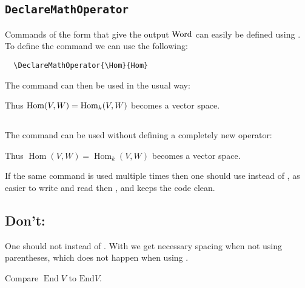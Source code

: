\documentclass[a4paper, 10pt, abstract=on, headings=standardclasses]{scrartcl}
\begin{document}
\subsection{\texttt{DeclareMathOperator}}

Commands of the form  that give the output $\operatorname{Word}$ can easily be defined using .
To define the command  we can use the following:
\begin{lstlisting}
  \DeclareMathOperator{\Hom}{Hom}
\end{lstlisting}
The command  can then be used in the usual way:
\begin{LTXexample}[pos = b]
  Thus $\Hom(V,W) = \Hom_k(V,W)$ becomes a vector space.
\end{LTXexample}



\subsection{}

The command  can be used without defining a completely new operator:
\begin{LTXexample}[pos = b]
  Thus $\operatorname{Hom}(V,W) = \operatorname{Hom}_k(V,W)$ becomes a vector space.
\end{LTXexample}
If the same command is used multiple times then one should use  instead of , as  easier to write and read then , and keeps the code clean.



\subsection{Don’t: }

One should not  instead of .
With  we get necessary spacing when not using parentheses, which does not happen when using .
\begin{LTXexample}[pos = r]
  Compare $\operatorname{End} V$ to $\mathrm{End} V$.
\end{LTXexample}



\subsection{}
\end{document}
